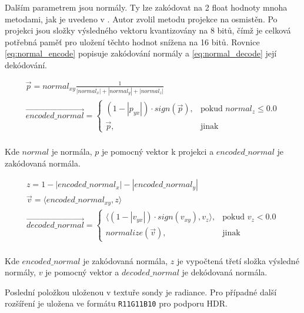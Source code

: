Dalším parametrem jsou normály. Ty lze zakódovat na 2 float hodnoty mnoha metodami, jak je uvedeno v \cite{Cigolle2014ASO}. Autor zvolil metodu projekce na osmistěn. Po projekci jsou složky výsledného vektoru kvantizovány na 8 bitů, čímž je celková potřebná paměť pro uložení těchto hodnot snížena na 16 bitů. Rovnice \ref{eq:normal_encode} popisuje zakódování normály a \ref{eq:normal_decode} její dekódování.

\begin{equation} \label{eq:normal_encode}
	\begin{gathered}
		\vec{p} = normal_{xy} \frac{1}{|normal_x| + |normal_y| + |normal_z|} \\
		\vec{encoded\_normal} = \begin{cases}
            (1 - |p_{yx}|) \cdot sign(\vec{p}),& \text{pokud } normal_z \leq 0.0\\
            \vec{p},              & \text{jinak}
        \end{cases}\\
	\end{gathered}
\end{equation}

Kde $normal$ je normála, $p$ je pomocný vektor k projekci a $encoded\_normal$ je zakódovaná normála.

\begin{equation} \label{eq:normal_decode}
	\begin{gathered}
	    z = 1 - |encoded\_normal_x| - |encoded\_normal_y|\\
	    \vec{v} = \langle encoded\_normal_{xy}, z \rangle\\
		\vec{decoded\_normal} = \begin{cases}
            \langle (1 - |v_{yx}|) \cdot sign(v_{xy}), v_z \rangle,& \text{pokud } v_z < 0.0\\
            normalize(\vec{v}),              & \text{jinak}
        \end{cases}\\
	\end{gathered}
\end{equation}

Kde $encoded\_normal$ je zakódovaná normála, $z$ je vypočtená třetí složka výsledné normály, $v$ je pomocný vektor a $decoded\_normal$ je dekódovaná normála.

Poslední položkou uloženou v textuře sondy je radiance. Pro případné další rozšíření je uložena ve formátu \texttt{R11G11B10} pro podporu HDR.

